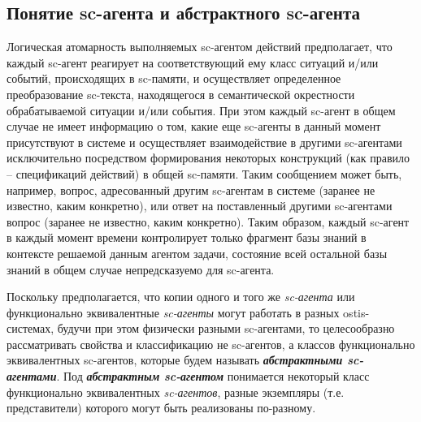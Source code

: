 \subsection{Понятие sc-агента и абстрактного sc-агента}

\begin{SCn}
\end{SCn}

Логическая атомарность выполняемых sc-агентом действий предполагает, что каждый sc-агент реагирует на соответствующий ему класс ситуаций и/или событий, происходящих в sc-памяти, и осуществляет определенное преобразование sc-текста, находящегося в семантической окрестности обрабатываемой ситуации и/или события. При этом каждый sc-агент в общем случае не имеет информацию о том, какие еще sc-агенты в данный момент присутствуют в системе и осуществляет взаимодействие в другими sc-агентами исключительно посредством формирования некоторых конструкций (как правило – спецификаций действий) в общей sc-памяти. Таким сообщением может быть, например, вопрос, адресованный другим sc-агентам в системе (заранее не известно, каким конкретно), или ответ на поставленный другими sc-агентами вопрос (заранее не известно, каким конкретно). Таким образом, каждый sc-агент в каждый момент времени контролирует только фрагмент базы знаний в контексте решаемой данным агентом задачи, состояние всей остальной базы знаний в общем случае непредсказуемо для sc-агента.

Поскольку предполагается, что копии одного и того же \textit{sc-агента} или функционально эквивалентные \textit{sc-агенты} могут работать в разных ostis-системах, будучи при этом физически разными sc-агентами, то целесообразно рассматривать свойства и классификацию не sc-агентов, а классов функционально эквивалентных sc-агентов, которые будем называть \textbf{\textit{абстрактными sc-агентами}}.
Под \textbf{\textit{абстрактным sc-агентом}} понимается некоторый класс функционально эквивалентных \textit{sc-агентов}, разные экземпляры (т.е. представители) которого могут быть реализованы по-разному.
	
